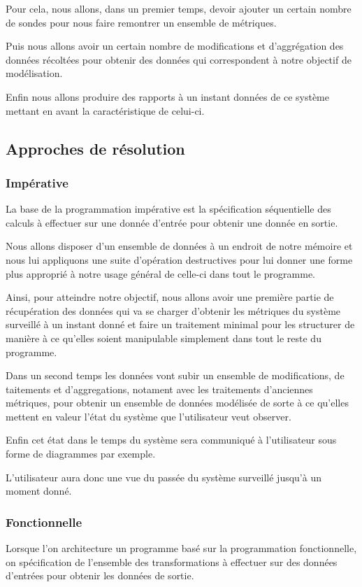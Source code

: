 \documentclass{article}
\begin{document}
Pour cela, nous allons, dans un premier temps, devoir ajouter un certain
nombre de sondes pour nous faire remontrer un ensemble de métriques.

Puis nous allons avoir un certain nombre de modifications et d'aggrégation des
données récoltées pour obtenir des données qui correspondent à notre objectif
de modélisation.

Enfin nous allons produire des rapports à un instant données de ce système mettant
en avant la caractéristique de celui-ci.

\subsection{Approches de résolution}
\subsubsection{Impérative}
La base de la programmation impérative est la spécification séquentielle
des calculs à effectuer sur une donnée d'entrée pour obtenir une donnée en sortie.

Nous allons disposer d'un ensemble de données à un endroit de notre mémoire et
nous lui appliquons une suite d'opération destructives pour lui donner une forme
plus approprié à notre usage général de celle-ci dans tout le programme.

Ainsi, pour atteindre notre objectif, nous allons avoir une première partie de
récupération des données qui va se charger d'obtenir les métriques du système
surveillé à un instant donné et faire un traitement minimal pour les structurer
de manière à ce qu'elles soient manipulable simplement dans tout le reste du programme.

Dans un second temps les données vont subir un ensemble de modifications, de
taitements et d'aggregations, notament avec les traitements d'anciennes métriques,
pour obtenir un ensemble de données modélisée de sorte à ce qu'elles mettent en
valeur l'état du système que l'utilisateur veut observer.

Enfin cet état dans le temps du système sera communiqué à l'utilisateur sous forme
de diagrammes par exemple.

L'utilisateur aura donc une vue du passée du système surveillé jusqu'à un moment donné.

\subsubsection{Fonctionnelle}
Lorsque l'on architecture un programme basé sur la programmation fonctionnelle,
on spécification de l'ensemble des transformations à effectuer sur des données
d'entrées pour obtenir les données de sortie.
\end{document}
